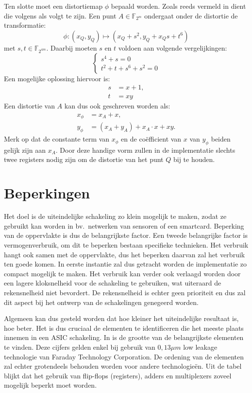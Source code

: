 Ten slotte moet een distortiemap $\phi$ bepaald worden. Zoals reeds vermeld in  dient die volgens \cite{barreto-efficient} als volgt te zijn. Een punt $A \in \mathbb{F}_{2^m}$ ondergaat onder de distortie de transformatie:
\[\phi : (x_Q, y_Q) \mapsto (x_Q + s^2, y_Q + x_Q s + t^6)\]
met $s, t \in \mathbb{F}_{2^{4m}}$. Daarbij moeten $s$ en $t$ voldoen aan volgende vergelijkingen:
\[\left\{\begin{array}{l}
s^4 + s = 0\\
t^2 + t + s^6 + s^2 = 0
\end{array}\right.\]
Een mogelijke oplossing hiervoor is:
\[\begin{aligned}
s	&= x + 1,\\
t	&= xy
\end{aligned}\]
Een distortie van $A$ kan dus ook geschreven worden als:
\[\begin{aligned}
x_\phi	&= x_A + x,\\
y_\phi	&= (x_A + y_A) + x_A \cdot x + xy.
\end{aligned}\]
Merk op dat de constante term van $x_\phi$ en de co\"efficient van $x$ van $y_\phi$ beiden gelijk zijn aan $x_A$. Door deze handige vorm zullen in de implementatie slechts twee registers nodig zijn om de distortie van het punt $Q$ bij te houden.

\section{Beperkingen\label{sectie-implementatie-beperkingen}}

Het doel is de uiteindelijke schakeling zo klein mogelijk te maken, zodat ze gebruikt kan worden in bv.\ netwerken van sensoren of een smartcard. Beperking van de oppervlakte is dus de belangrijkste factor. Een tweede belangrijke factor is vermogenverbruik, om dit te beperken bestaan specifieke technieken. Het verbruik hangt ook samen met de oppervlakte, dus het beperken daarvan zal het verbruik ten goede komen. In eerste instantie zal dus getracht worden de implementatie zo compact mogelijk te maken. Het verbruik kan verder ook verlaagd worden door een lagere kloksnelheid voor de schakeling te gebruiken, wat uiteraard de rekensnelheid niet bevordert. De rekensnelheid is echter geen prioriteit en dus zal dit aspect bij het ontwerp van de schakelingen genegeerd worden.

Algemeen kan dus gesteld worden dat hoe kleiner het uiteindelijke resultaat is, hoe beter. Het is dus cruciaal de elementen te identificeren die het meeste plaats innemen in een ASIC schakeling. In  is de grootte van de belangrijkste elementen te vinden. Deze cijfers gelden enkel bij gebruik van $0,13 \mu m$ low leakage technologie van Faraday Technology Corporation. De ordening van de elementen zal echter grotendeels behouden worden voor andere technologie\"en. Uit de tabel blijkt dat het gebruik van flip-flops (registers), adders en multiplexers zoveel mogelijk beperkt moet worden.

